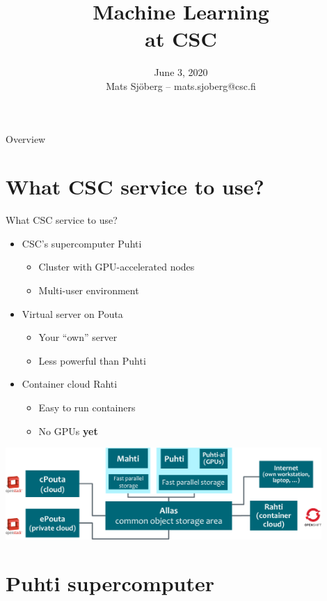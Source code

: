 \documentclass[aspectratio=1610,14pt]{beamer}
\title{Machine Learning \\at CSC}
\subtitle{June 3, 2020\\[2mm]
  Mats Sjöberg -- mats.sjoberg@csc.fi}
\begin{document}
\begin{frame}{Overview}
  \tableofcontents
\end{frame}

\section{What CSC service to use?}


\begin{frame}{What CSC service to use?}
  \begin{itemize}
  \item CSC's supercomputer \alert{Puhti}
    \begin{itemize}
    \item<2-> Cluster with GPU-accelerated nodes
    \item<2-> Multi-user environment
    \end{itemize}
  \item Virtual server on \alert{Pouta}
    \begin{itemize}
    \item<3-> Your ``own'' server
    \item<3-> Less powerful than Puhti
    \end{itemize}
  \item Container cloud \alert{Rahti}
    \begin{itemize}
    \item<4-> Easy to run containers
    \item<4-> No GPUs \textbf{yet}
    \end{itemize}
  \end{itemize}
  \vspace{-5mm}
  \begin{flushright}
  \includegraphics[width=0.9\textwidth]{csc-services}  
  \end{flushright}
\end{frame}

\section{Puhti supercomputer}
\end{document}

